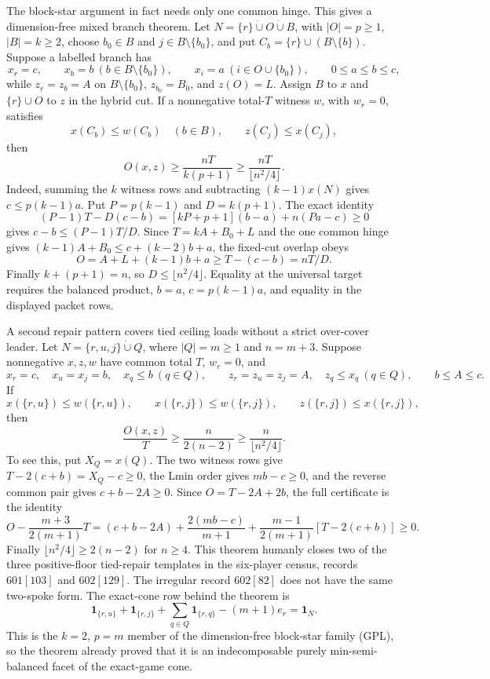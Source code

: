 \documentclass[11pt]{article}
\newcommand{\one}{\mathbf 1}
\begin{document}
The block-star argument in fact needs only one common hinge.  This gives a
dimension-free mixed branch theorem.  Let
$N=\{r\}\mathbin{\dot\cup}O\mathbin{\dot\cup}B$, with
$|O|=p\ge1$, $|B|=k\ge2$, choose $b_0\in B$ and
$j\in B\setminus\{b_0\}$, and put
$C_b=\{r\}\cup(B\setminus\{b\})$.  Suppose a labelled branch has
\[
 x_r=c,\qquad x_b=b\ (b\in B\setminus\{b_0\}),\qquad
 x_i=a\ (i\in O\cup\{b_0\}),\qquad 0\le a\le b\le c,
\]
while $z_r=z_b=A$ on $B\setminus\{b_0\}$,
$z_{b_0}=B_0$, and $z(O)=L$.  Assign $B$ to $x$ and
$\{r\}\cup O$ to $z$ in the hybrid cut.  If a nonnegative total-$T$
witness $w$, with $w_r=0$, satisfies
\[
 x(C_b)\le w(C_b)\quad(b\in B),
 \qquad z(C_j)\le x(C_j),                              \tag{MBS}
\]
then
\[
 O(x,z)\ge\frac{nT}{k(p+1)}
          \ge\frac{nT}{\lfloor n^2/4\rfloor}.          \tag{MBB}
\]
Indeed, summing the $k$ witness rows and subtracting $(k-1)x(N)$ gives
$c\le p(k-1)a$.  Put $P=p(k-1)$ and $D=k(p+1)$.  The exact identity
\[
 (P-1)T-D(c-b)
 =[kP+p+1](b-a)+n(Pa-c)\ge0                            \tag{MBI}
\]
gives $c-b\le(P-1)T/D$.  Since
$T=kA+B_0+L$ and the one common hinge gives
$(k-1)A+B_0\le c+(k-2)b+a$, the fixed-cut overlap obeys
\[
 O=A+L+(k-1)b+a\ge T-(c-b)=nT/D.
\]
Finally $k+(p+1)=n$, so $D\le\lfloor n^2/4\rfloor$.
Equality at the universal target requires the balanced product,
$b=a$, $c=p(k-1)a$, and equality in the displayed packet rows.

A second repair pattern covers tied ceiling loads without a strict
over-cover leader.  Let
$N=\{r,u,j\}\mathbin{\dot\cup}Q$, where $|Q|=m\ge1$ and $n=m+3$.
Suppose nonnegative $x,z,w$ have common total $T$, $w_r=0$, and
\[
 x_r=c,\quad x_u=x_j=b,\quad x_q\le b\ (q\in Q),
 \qquad
 z_r=z_u=z_j=A,\quad z_q\le x_q\ (q\in Q),
 \qquad b\le A\le c.
\]
If
\[
 x(\{r,u\})\le w(\{r,u\}),\qquad
 x(\{r,j\})\le w(\{r,j\}),\qquad
 z(\{r,j\})\le x(\{r,j\}),                         \tag{TCS}
\]
then
\[
 \frac{O(x,z)}T\ge\frac{n}{2(n-2)}
                  \ge\frac{n}{\lfloor n^2/4\rfloor}. \tag{TCB}
\]
To see this, put $X_Q=x(Q)$.  The two witness rows give
$T-2(c+b)=X_Q-c\ge0$, the Lmin order gives $mb-c\ge0$, and the reverse
common pair gives $c+b-2A\ge0$.  Since
$O=T-2A+2b$, the full certificate is the identity
\[
 O-\frac{m+3}{2(m+1)}T
 =(c+b-2A)+\frac{2(mb-c)}{m+1}
  +\frac{m-1}{2(m+1)}[T-2(c+b)]\ge0.                 \tag{TCI}
\]
Finally $\lfloor n^2/4\rfloor\ge2(n-2)$ for $n\ge4$.
This theorem humanly closes two of the three positive-floor tied-repair
templates in the six-player census, records $601[103]$ and $602[129]$.
The irregular record $602[82]$ does not have the same two-spoke form.
The exact-cone row behind the theorem is
\[
 \one_{\{r,u\}}+\one_{\{r,j\}}
 +\sum_{q\in Q}\one_{\{r,q\}}-(m+1)e_r=\one_N.       \tag{TCSF}
\]
This is the $k=2$, $p=m$ member of the dimension-free block-star family
(GPL), so the theorem already proved that it is an indecomposable purely
min-semi-balanced facet of the exact-game cone.
\end{document}
